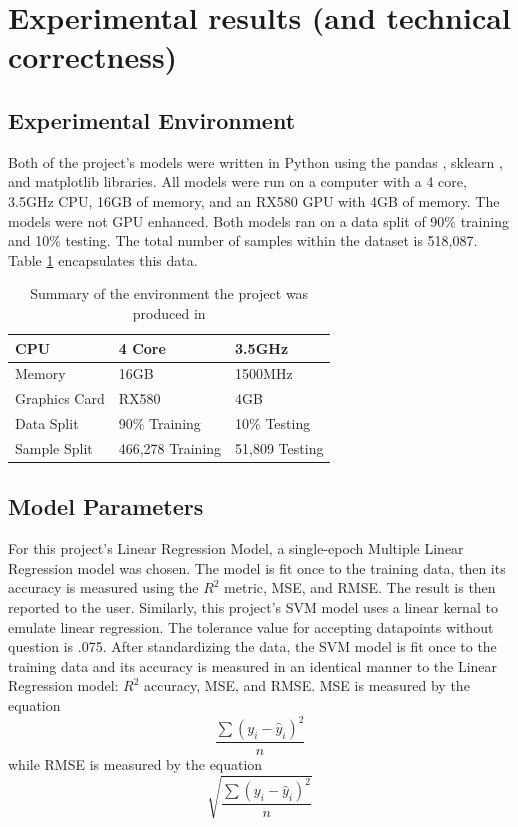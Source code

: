 \documentclass[compsoc]{IEEEtran}
\begin{document}
\section{Experimental results (and technical correctness)}
\subsection{Experimental Environment}
Both of the project's models were written in Python using the pandas \cite{lib:pandas}, sklearn \cite{lib:sklearn}, and matplotlib \cite{model:matplotlib} libraries. All models were run on a computer with a 4 core, 3.5GHz CPU, 16GB of memory, and an RX580 GPU with 4GB of memory. The models were not GPU enhanced. Both models ran on a data split of 90\% training and 10\% testing. The total number of samples within the dataset is 518,087. Table \ref{table:environment} encapsulates this data.

\begin{table}[h]
\centering
\caption{Summary of the environment the project was produced in}
\begin{tabular}{|l|l|l|}
\hline
CPU & 4 Core & 3.5GHz \\ \hline
Memory & 16GB & 1500MHz \\ \hline
Graphics Card & RX580 & 4GB \\ \hline
Data Split & 90\% Training & 10\% Testing\\ \hline
Sample Split & 466,278 Training & 51,809 Testing \\ \hline
\end{tabular}
\label{table:environment}
\end{table}

\subsection{Model Parameters}
For this project's Linear Regression Model, a single-epoch Multiple Linear Regression \cite{model:multiple_linear_regression} model was chosen. The model is fit once to the training data, then its accuracy is measured using the $R^2$ metric, MSE, and RMSE. The result is then reported to the user. Similarly, this project's SVM \cite{model:svm} model uses a linear kernal to emulate linear regression. The tolerance value for accepting datapoints without question is .075. After standardizing the data, the SVM model is fit once to the training data and its accuracy is measured in an identical manner to the Linear Regression model: $R^2$ accuracy, MSE, and RMSE. MSE \cite{website:mse} is measured by the equation \[\frac{\sum(y_i - \hat{y}_i)^2}{n}\] while RMSE \cite{website:rmse} is measured by the equation \[\sqrt{\frac{\sum(y_i - \hat{y}_i)^2}{n}}\]
\end{document}
